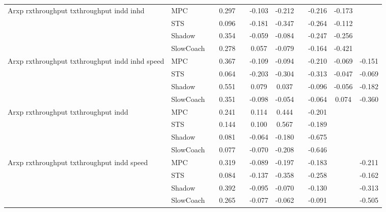 \begin{tabular}{|l|l|*{9}{c|}}
\midrule
Arxp rxthroughput txthroughput indd inhd    & MPC &       &     0.297 &        & -0.103 & -0.212 &     &  -0.216 &  -0.173 &       \\
                              & STS &       &     0.096 &        & -0.181 & -0.347 &     &  -0.264 &  -0.112 &       \\
                              & Shadow &       &     0.354 &        & -0.059 & -0.084 &     &  -0.247 &  -0.256 &       \\
                              & SlowCoach &       &     0.278 &        &  0.057 & -0.079 &     &  -0.164 &  -0.421 &       \\
\midrule
Arxp rxthroughput txthroughput indd inhd speed    & MPC &       &     0.367 &        & -0.109 & -0.094 &     &  -0.210 &  -0.069 &   -0.151 \\
                              & STS &       &     0.064 &        & -0.203 & -0.304 &     &  -0.313 &  -0.047 &   -0.069 \\
                              & Shadow &       &     0.551 &        &  0.079 &  0.037 &     &  -0.096 &  -0.056 &   -0.182 \\
                              & SlowCoach &       &     0.351 &        & -0.098 & -0.054 &     &  -0.064 &   0.074 &   -0.360 \\
\midrule
Arxp rxthroughput txthroughput indd    & MPC &       &     0.241 &        &  0.114 &  0.444 &     &  -0.201 &      &       \\
                              & STS &       &     0.144 &        &  0.100 &  0.567 &     &  -0.189 &      &       \\
                              & Shadow &       &     0.081 &        & -0.064 & -0.180 &     &  -0.675 &      &       \\
                              & SlowCoach &       &     0.077 &        & -0.070 & -0.208 &     &  -0.646 &      &       \\
\midrule
Arxp rxthroughput txthroughput indd speed    & MPC &       &     0.319 &        & -0.089 & -0.197 &     &  -0.183 &      &   -0.211 \\
                              & STS &       &     0.084 &        & -0.137 & -0.358 &     &  -0.258 &      &   -0.162 \\
                              & Shadow &       &     0.392 &        & -0.095 & -0.070 &     &  -0.130 &      &   -0.313 \\
                              & SlowCoach &       &     0.265 &        & -0.077 & -0.062 &     &  -0.091 &      &   -0.505 \\

\end{tabular}
